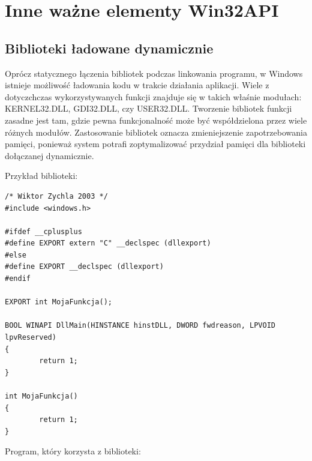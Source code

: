 ﻿\section{Inne ważne elementy Win32API}

\subsection{Biblioteki ładowane dynamicznie}

Oprócz statycznego łączenia bibliotek podczas linkowania programu, w Windows istnieje możliwość 
ładowania kodu w trakcie działania aplikacji. Wiele z dotyczchczas wykorzystywanych funkcji znajduje się
w takich właśnie modułach: KERNEL32.DLL, GDI32.DLL, czy USER32.DLL. Tworzenie bibliotek funkcji zasadne jest tam,
gdzie pewna funkcjonalność może być współdzielona przez wiele różnych modułów. Zastosowanie bibliotek
oznacza zmieniejszenie zapotrzebowania pamięci, ponieważ system potrafi zoptymalizować przydział pamięci
dla biblioteki dołączanej dynamicznie.


Przykład biblioteki:

\begin{scriptsize}
\begin{verbatim}
/* Wiktor Zychla 2003 */
#include <windows.h>

#ifdef __cplusplus
#define EXPORT extern "C" __declspec (dllexport)
#else
#define EXPORT __declspec (dllexport)
#endif

EXPORT int MojaFunkcja();

BOOL WINAPI DllMain(HINSTANCE hinstDLL, DWORD fwdreason, LPVOID lpvReserved)
{
        return 1;
}

int MojaFunkcja()
{
        return 1;
}
\end{verbatim}
\end{scriptsize}

Program, który korzysta z biblioteki:


